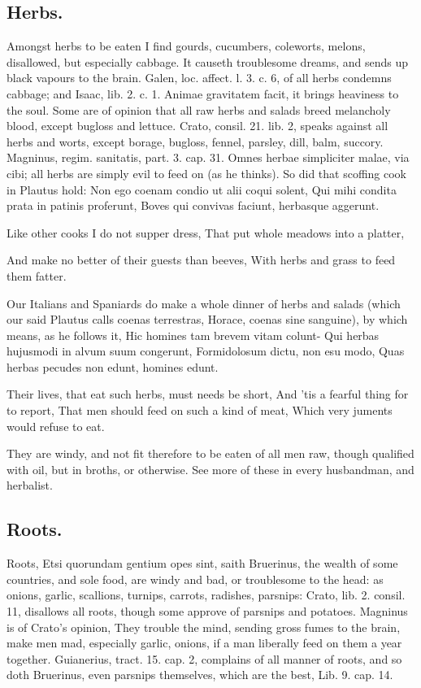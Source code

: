 {\subsection{Herbs.}
Amongst herbs to be eaten I find gourds, cucumbers,
coleworts, melons, disallowed, but especially cabbage. It causeth
troublesome dreams, and sends up black vapours to the brain. Galen,
loc. affect. l. 3. c. 6, of all herbs condemns cabbage; and Isaac, lib.
2. c. 1. Animae gravitatem facit, it brings heaviness to the soul. Some
are of opinion that all raw herbs and salads breed melancholy blood,
except bugloss and lettuce. Crato, consil. 21. lib. 2, speaks against
all herbs and worts, except borage, bugloss, fennel, parsley, dill,
balm, succory. Magninus, regim. sanitatis, part. 3. cap. 31. Omnes
herbae simpliciter malae, via cibi; all herbs are simply evil to feed
on (as he thinks). So did that scoffing cook in Plautus hold:
Non ego coenam condio ut alii coqui solent,
Qui mihi condita prata in patinis proferunt,
Boves qui convivas faciunt, herbasque aggerunt.


Like other cooks I do not supper dress,
That put whole meadows into a platter,

And make no better of their guests than beeves,
With herbs and grass to feed them fatter.

Our Italians and Spaniards do make a whole dinner of herbs and salads
(which our said Plautus calls coenas terrestras, Horace, coenas sine
sanguine), by which means, as he follows it,
Hic homines tam brevem vitam colunt-
Qui herbas hujusmodi in alvum suum congerunt,
Formidolosum dictu, non esu modo,
Quas herbas pecudes non edunt, homines edunt.

Their lives, that eat such herbs, must needs be short,
And 'tis a fearful thing for to report,
That men should feed on such a kind of meat,
Which very juments would refuse to eat.

They are windy, and not fit therefore to be eaten of all men raw,
though qualified with oil, but in broths, or otherwise. See more of
these in every husbandman, and herbalist.
\subsection{Roots.}
Roots, Etsi quorundam gentium opes sint, saith Bruerinus, the
wealth of some countries, and sole food, are windy and bad, or
troublesome to the head: as onions, garlic, scallions, turnips,
carrots, radishes, parsnips: Crato, lib. 2. consil. 11, disallows all
roots, though  some approve of parsnips and potatoes.
Magninus is of Crato's opinion, They trouble the mind,
sending gross fumes to the brain, make men mad, especially garlic,
onions, if a man liberally feed on them a year together. Guianerius,
tract. 15. cap. 2, complains of all manner of roots, and so doth
Bruerinus, even parsnips themselves, which are the best, Lib. 9. cap.
14.
}

